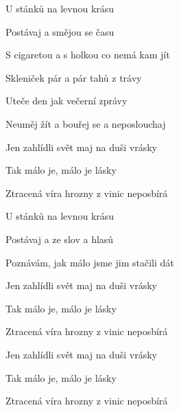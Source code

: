 \begin{song}


\begin{hchordbox}
\end{hchordbox}

\Large

\bigskip

U stánků na levnou krásu \par
{}Postávaj a smějou se času \par
{}S cigaretou a s holkou co nemá kam jít \par

\bigskip

Skleniček pár a pár tahů z trávy \par
{}Uteče den jak večerní zprávy \par
{}Neuměj žít a bouřej se a neposlouchaj  \par

\bigskip

Jen zahlídli svět maj na duši vrásky \par
Tak málo je, málo je lásky \par
{}Ztracená víra hrozny z vinic neposbírá \par

\bigskip

U stánků na levnou krásu \par
{}Postávaj a ze slov a hlasů \par
{}Poznávám, jak málo jsme jim stačili dát  \par

\bigskip

Jen zahlídli svět maj na duši vrásky \par
Tak málo je, málo je lásky \par
{}Ztracená víra hrozny z vinic neposbírá  \par

\bigskip

Jen zahlídli svět maj na duši vrásky \par
Tak málo je, málo je lásky \par
{}Ztracená víra hrozny z vinic neposbírá \par

\end{song}
